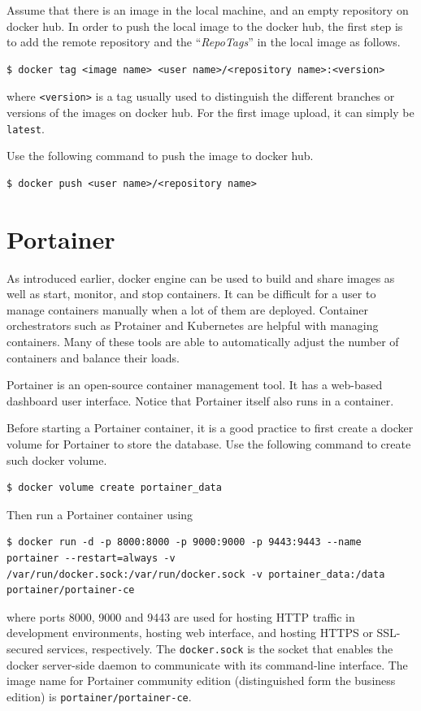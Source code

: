 Assume that there is an image in the local machine, and an empty repository on docker hub. In order to push the local image to the docker hub, the first step is to add the remote repository and the ``\textit{RepoTags}'' in the local image as follows.
\begin{lstlisting}
$ docker tag <image name> <user name>/<repository name>:<version>
\end{lstlisting}
where \verb|<version>| is a tag usually used to distinguish the different branches or versions of the images on docker hub. For the first image upload, it can simply be \verb|latest|.

Use the following command to push the image to docker hub.
\begin{lstlisting}
$ docker push <user name>/<repository name>
\end{lstlisting}

\section{Portainer}

As introduced earlier, docker engine can be used to build and share images as well as start, monitor, and stop containers. It can be difficult for a user to manage containers manually when a lot of them are deployed. Container orchestrators such as Protainer and Kubernetes are helpful with managing containers. Many of these tools are able to automatically adjust the number of containers and balance their loads.

Portainer is an open-source container management tool. It has a web-based dashboard user interface. Notice that Portainer itself also runs in a container.

Before starting a Portainer container, it is a good practice to first create a docker volume for Portainer to store the database. Use the following command to create such docker volume.
\begin{lstlisting}
$ docker volume create portainer_data
\end{lstlisting}
Then run a Portainer container using
\begin{lstlisting}
$ docker run -d -p 8000:8000 -p 9000:9000 -p 9443:9443 --name portainer --restart=always -v /var/run/docker.sock:/var/run/docker.sock -v portainer_data:/data portainer/portainer-ce
\end{lstlisting}
where ports 8000, 9000 and 9443 are used for hosting HTTP traffic in development environments, hosting web interface, and hosting HTTPS or SSL-secured services, respectively. The \verb|docker.sock| is the socket that enables the docker server-side daemon to communicate with its command-line interface. The image name for Portainer community edition (distinguished form the business edition) is \verb|portainer/portainer-ce|.

